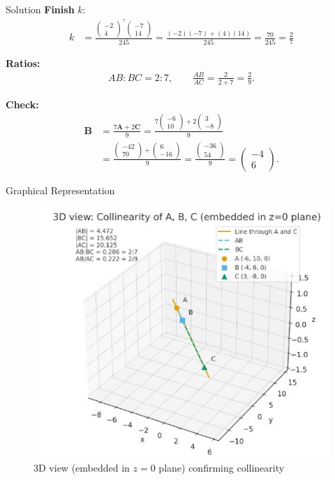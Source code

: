 \documentclass{beamer}
\theoremstyle{remark}
\newcommand{\myvec}[1]{\ensuremath{\begin{pmatrix}#1\end{pmatrix}}}
\let\vec\mathbf
\begin{document}
\begin{frame}[t]{Solution}
\small
\textbf{Finish }$k$:
\begin{align*}
k&=\frac{\myvec{-2\\4}^{\!\top}\myvec{-7\\14}}{245}
=\frac{(-2)(-7)+(4)(14)}{245}
=\frac{70}{245}
=\boxed{\tfrac{2}{7}}
\end{align*}

\textbf{Ratios:}
\begin{align*}
AB:BC=\boxed{2:7},\qquad
\frac{AB}{AC}=\frac{2}{2+7}=\boxed{\tfrac{2}{9}}.
\end{align*}

\textbf{Check:}
\begin{align*}
\vec{B}
&=\frac{7\vec{A}+2\vec{C}}{9}
=\frac{7\myvec{-6\\10}+2\myvec{3\\-8}}{9}\\
&=\frac{\myvec{-42\\70}+\myvec{6\\-16}}{9}
=\frac{\myvec{-36\\54}}{9}
=\myvec{-4\\6}.
\end{align*}
\end{frame}
\begin{frame}{Graphical Representation}
   \begin{figure}[h!]
\centering
\includegraphics[width=0.7\linewidth]{figs/matgeo-1.4.14.jpeg}
\caption{3D view (embedded in $z=0$ plane) confirming collinearity}
\end{figure} 
\end{frame}
\end{document}
